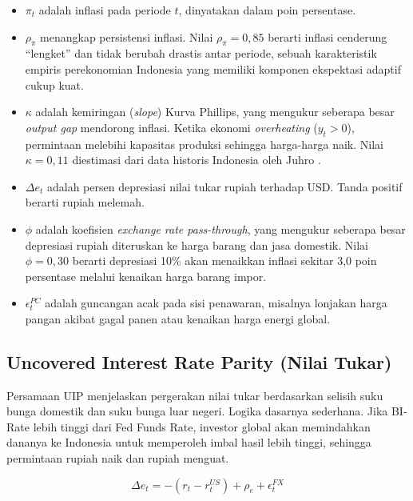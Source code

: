 \begin{itemize}
    \item $\pi_t$ adalah inflasi pada periode $t$, dinyatakan dalam poin persentase.
    \item $\rho_\pi$ menangkap persistensi inflasi. Nilai $\rho_\pi = 0,85$ berarti inflasi cenderung ``lengket'' dan tidak berubah drastis antar periode, sebuah karakteristik empiris perekonomian Indonesia yang memiliki komponen ekspektasi adaptif cukup kuat.
    \item $\kappa$ adalah kemiringan (\textit{slope}) Kurva Phillips, yang mengukur seberapa besar \textit{output gap} mendorong inflasi. Ketika ekonomi \textit{overheating} ($y_t > 0$), permintaan melebihi kapasitas produksi sehingga harga-harga naik. Nilai $\kappa = 0,11$ diestimasi dari data historis Indonesia oleh Juhro \cite{juhro2004}.
    \item $\Delta e_t$ adalah persen depresiasi nilai tukar rupiah terhadap USD. Tanda positif berarti rupiah melemah.
    \item $\phi$ adalah koefisien \textit{exchange rate pass-through}, yang mengukur seberapa besar depresiasi rupiah diteruskan ke harga barang dan jasa domestik. Nilai $\phi = 0,30$ berarti depresiasi 10\% akan menaikkan inflasi sekitar 3,0 poin persentase melalui kenaikan harga barang impor.
    \item $\epsilon_t^{PC}$ adalah guncangan acak pada sisi penawaran, misalnya lonjakan harga pangan akibat gagal panen atau kenaikan harga energi global.
\end{itemize}

\subsection{Uncovered Interest Rate Parity (Nilai Tukar)}

Persamaan UIP menjelaskan pergerakan nilai tukar berdasarkan selisih suku bunga domestik dan suku bunga luar negeri. Logika dasarnya sederhana. Jika BI-Rate lebih tinggi dari Fed Funds Rate, investor global akan memindahkan dananya ke Indonesia untuk memperoleh imbal hasil lebih tinggi, sehingga permintaan rupiah naik dan rupiah menguat.

\[
    \Delta e_t = -\left( r_t - r_t^{US} \right) + \rho_e + \epsilon_t^{FX}
\]

